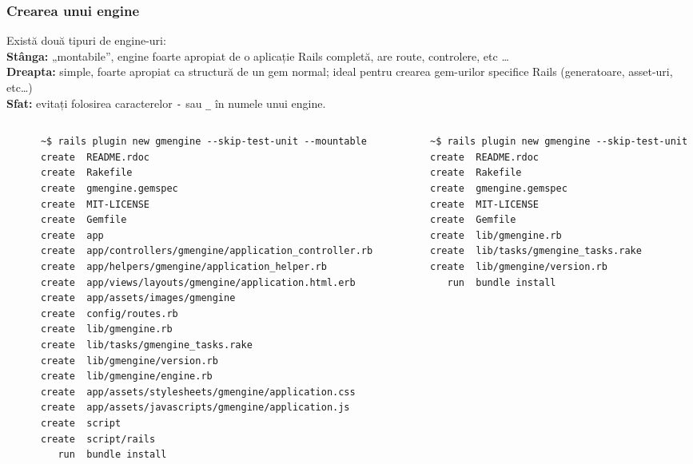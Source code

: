 \documentclass[compress]{beamer}
\begin{document}
\begin{frame}[fragile]
\frametitle{Crearea unui engine}

\begin{center}
  \begin{tiny}
    Există două tipuri de engine-uri:
    \\
    \textbf{Stânga:} „montabile”, engine foarte apropiat de o aplicație Rails completă, are route, controlere, etc \ldots
    \\
    \textbf{Dreapta:} simple, foarte apropiat ca structură de un gem normal; ideal pentru crearea gem-urilor specifice Rails (generatoare, asset-uri, etc\ldots)
    \\
    \textbf{Sfat:} evitați folosirea caracterelor \texttt{-} sau \texttt{\_} în numele unui engine.
  \end{tiny}
\end{center}

\begin{columns}
  \begin{column}{0.6\textwidth}
    \begin{verbatim}
      ~$ rails plugin new gmengine --skip-test-unit --mountable
      create  README.rdoc
      create  Rakefile
      create  gmengine.gemspec
      create  MIT-LICENSE
      create  Gemfile
      create  app
      create  app/controllers/gmengine/application_controller.rb
      create  app/helpers/gmengine/application_helper.rb
      create  app/views/layouts/gmengine/application.html.erb
      create  app/assets/images/gmengine
      create  config/routes.rb
      create  lib/gmengine.rb
      create  lib/tasks/gmengine_tasks.rake
      create  lib/gmengine/version.rb
      create  lib/gmengine/engine.rb
      create  app/assets/stylesheets/gmengine/application.css
      create  app/assets/javascripts/gmengine/application.js
      create  script
      create  script/rails
         run  bundle install
    \end{verbatim}
  \end{column}

  \begin{column}{0.4\textwidth}
    \begin{verbatim}
      ~$ rails plugin new gmengine --skip-test-unit
      create  README.rdoc
      create  Rakefile
      create  gmengine.gemspec
      create  MIT-LICENSE
      create  Gemfile
      create  lib/gmengine.rb
      create  lib/tasks/gmengine_tasks.rake
      create  lib/gmengine/version.rb
         run  bundle install
    \end{verbatim}
    \end{column}
  \end{columns}
\end{frame}
\end{document}
